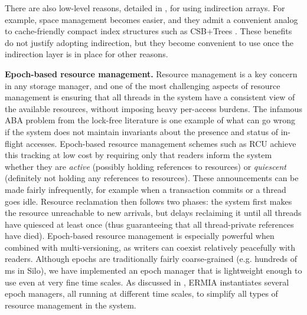 There are also low-level reasons, detailed in , for using indirection arrays. For example, space management becomes easier, and they admit a convenient analog to cache-friendly compact index structures such as CSB+Trees \cite{RaoR00}. These benefits do not justify adopting indirection, but they become convenient to use once the indirection layer is in place for other reasons.

\vspace{2mm}
{\bf Epoch-based resource management.}
Resource management is a key concern in any storage manager, and one of the most challenging aspects of resource management is ensuring that all threads in the system have a consistent view of the available resources, without imposing heavy per-access burdens. The infamous ABA problem from the lock-free literature is one example of what can go wrong if the system does not maintain invariants about the presence and status of in-flight accesses. Epoch-based resource management schemes such as RCU \cite{**RCU**} achieve this tracking at low cost by requiring only that readers inform the system whether they are {\em active} (possibly holding references to resources) or {\em quiescent} (definitely not holding any references to resources). These announcements can be made fairly infrequently, for example when a transaction commits or a thread goes idle. Resource reclamation then follows two phases: the system first makes the resource unreachable to new arrivals, but delays reclaiming it until all threads have quiesced at least once (thus guaranteeing that all thread-private references have died). Epoch-based resource management is especially powerful when combined with multi-versioning, as writers can coexist relatively peacefully with readers. Although epochs are traditionally fairly coarse-grained (e.g. hundreds of ms in Silo), we have implemented an epoch manager that is lightweight enough to use even at very fine time scales. As discussed in , ERMIA instantiates several epoch managers, all running at different time scales, to simplify all types of resource management in the system. 

